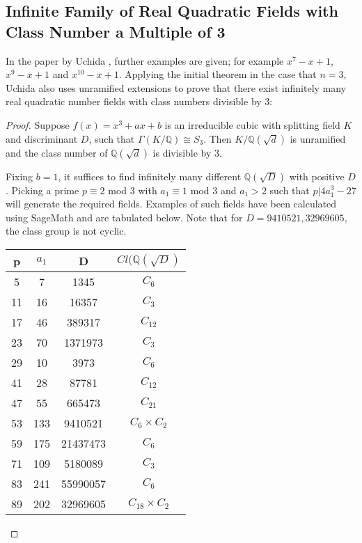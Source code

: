 \documentclass[12pt]{extarticle}
\newcommand{\Q}{\mathbb{Q}}
\newcommand{\<}{\langle}
\renewcommand{\>}{\rangle}
\theoremstyle{definition}
\begin{document}
\subsection{Infinite Family of Real Quadratic Fields with Class Number a Multiple of 3}
In the paper by Uchida \cite{uchida1970}, further examples are given; for example $x^7-x+1$, $x^9-x+1$ and $x^{10}-x+1$. 
Applying the initial theorem in the case that $n=3$, Uchida also uses unramified extensions to prove that there exist infinitely many real quadratic number fields with class numbers divisible by 3:
\begin{proof}
Suppose $f(x) = x^3+ax+b$ is an irreducible cubic with splitting field $K$ and discriminant $D$, such that $\Gamma(K/\Q) \cong S_3$. Then $K/\Q(\sqrt{d})$ is unramified and the class number of $\Q(\sqrt{d})$ is divisible by 3.  \par

Fixing $b=1$, it suffices to find infinitely many different $\Q(\sqrt{D})$ with positive $D$. Picking a prime $p \equiv 2$ mod 3 with $a_1 \equiv 1$ mod 3 and $a_1 > 2$ such that $p | 4a_1^3 - 27$ will generate the required fields. Examples of such fields have been calculated using SageMath and are tabulated below. Note that for $D=9410521,32969605$, the class group is not cyclic. 
\begin{center}
 \begin{tabular}{| c | c | c | c |}
 \hline
p & $a_1$ & D & $Cl(\Q(\sqrt{D})$  \\ 
\hline
5 &  7 & 1345 & $C_{6}$ \\
\hline
11 &  16 & 16357 & $C_{3}$ \\
\hline
17 &  46 & 389317 & $C_{12}$ \\
\hline
23 &  70 & 1371973 & $C_{3}$ \\
\hline
29 &  10 & 3973 & $C_{6}$ \\
\hline
41 &  28 & 87781 & $C_{12}$ \\
\hline
47 &  55 & 665473 & $C_{21}$ \\
\hline
53 &  133 & 9410521 & $C_{6} \times C_{2}$ \\
\hline
59 &  175 & 21437473 & $C_{6}$ \\
\hline
71 &  109 & 5180089 & $C_{3}$ \\
\hline
83 &  241 & 55990057 & $C_{6}$ \\
\hline
89 &  202 & 32969605 & $C_{18} \times C_{2}$ \\
\hline
\end{tabular}
\end{center}
\end{proof}
\end{document}
